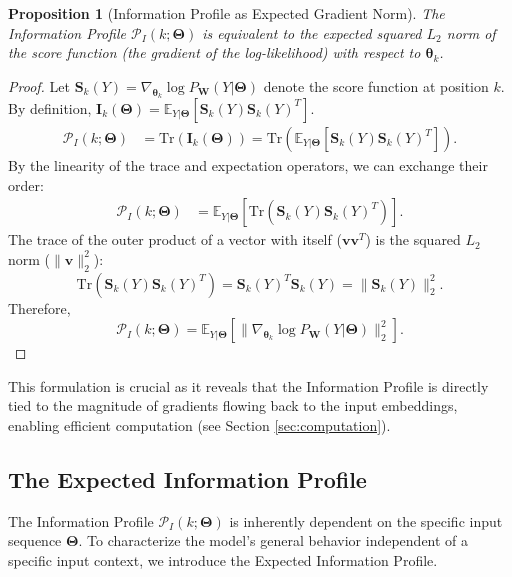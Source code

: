 \documentclass{article}
\newtheorem{proposition}[theorem]{Proposition}
\theoremstyle{definition}
\begin{document}
\begin{proposition}[Information Profile as Expected Gradient Norm]
\label{prop:profile_norm}
The Information Profile $\mathcal{P}_I(k; \mathbf{\Theta})$ is equivalent to the expected squared $L_2$ norm of the score function (the gradient of the log-likelihood) with respect to $\boldsymbol{\theta}_k$.
\end{proposition}
\begin{proof}
Let $\mathbf{S}_k(Y) = \nabla_{\boldsymbol{\theta}_k} \log P_{\mathbf{W}}(Y|\mathbf{\Theta})$ denote the score function at position $k$. By definition, $\mathbf{I}_k(\mathbf{\Theta}) = \mathbb{E}_{Y|\mathbf{\Theta}}[\mathbf{S}_k(Y) \mathbf{S}_k(Y)^T]$.
\begin{align}
    \mathcal{P}_I(k; \mathbf{\Theta}) &= \text{Tr}(\mathbf{I}_k(\mathbf{\Theta})) = \text{Tr}(\mathbb{E}_{Y|\mathbf{\Theta}}[\mathbf{S}_k(Y) \mathbf{S}_k(Y)^T]).
\end{align}
By the linearity of the trace and expectation operators, we can exchange their order:
\begin{align}
    \mathcal{P}_I(k; \mathbf{\Theta}) &= \mathbb{E}_{Y|\mathbf{\Theta}}[\text{Tr}(\mathbf{S}_k(Y) \mathbf{S}_k(Y)^T)].
\end{align}
The trace of the outer product of a vector with itself ($\mathbf{v}\mathbf{v}^T$) is the squared $L_2$ norm ($\|\mathbf{v}\|_2^2$):
\begin{equation}
    \text{Tr}(\mathbf{S}_k(Y) \mathbf{S}_k(Y)^T) = \mathbf{S}_k(Y)^T \mathbf{S}_k(Y) = \|\mathbf{S}_k(Y)\|_2^2.
\end{equation}
Therefore,
\begin{equation}
    \mathcal{P}_I(k; \mathbf{\Theta}) = \mathbb{E}_{Y|\mathbf{\Theta}}[\|\nabla_{\boldsymbol{\theta}_k} \log P_{\mathbf{W}}(Y|\mathbf{\Theta})\|_2^2].
\end{equation}
\end{proof}
This formulation is crucial as it reveals that the Information Profile is directly tied to the magnitude of gradients flowing back to the input embeddings, enabling efficient computation (see Section \ref{sec:computation}).

\subsection{The Expected Information Profile}
The Information Profile $\mathcal{P}_I(k; \mathbf{\Theta})$ is inherently dependent on the specific input sequence $\mathbf{\Theta}$. To characterize the model's general behavior independent of a specific input context, we introduce the Expected Information Profile.
\end{document}
